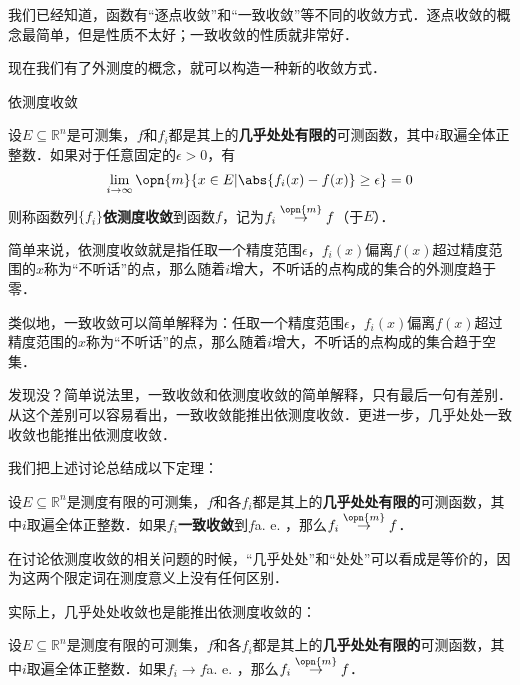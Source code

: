 

我们已经知道，函数有“逐点收敛”和“一致收敛”等不同的收敛方式．逐点收敛的概念最简单，但是性质不太好；一致收敛的性质就非常好．

现在我们有了外测度的概念，就可以构造一种新的收敛方式．

\begin{definition}{依测度收敛}

设$E\subseteq \mathbb{R}^n$是可测集，$f$和$f_i$都是其上的\textbf{几乎处处有限的}可测函数，其中$i$取遍全体正整数．如果对于任意固定的$\epsilon>0$，有
\begin{equation}
\lim\limits_{i\to\infty}\opn{m}\{x\in E|\abs{f_i(x)-f(x)}\geq\epsilon\}=0
\end{equation}
则称函数列$\{f_i\}$\textbf{依测度收敛}到函数$f$，记为$f_i\overset{\opn{m}}\to f$（于$E$）．

\end{definition}

简单来说，依测度收敛就是指任取一个精度范围$\epsilon$，$f_i(x)$偏离$f(x)$超过精度范围的$x$称为“不听话”的点，那么随着$i$增大，不听话的点构成的集合的外测度趋于零．

类似地，一致收敛可以简单解释为：任取一个精度范围$\epsilon$，$f_i(x)$偏离$f(x)$超过精度范围的$x$称为“不听话”的点，那么随着$i$增大，不听话的点构成的集合趋于空集．

发现没？简单说法里，一致收敛和依测度收敛的简单解释，只有最后一句有差别．从这个差别可以容易看出，一致收敛能推出依测度收敛．更进一步，几乎处处一致收敛也能推出依测度收敛．

我们把上述讨论总结成以下定理：



\begin{theorem}{}\label{LimMs_the2}

设$E\subseteq \mathbb{R}^n$是测度有限的可测集，$f$和各$f_i$都是其上的\textbf{几乎处处有限的}可测函数，其中$i$取遍全体正整数．如果$f_i$\textbf{一致收敛}到$f$a. e.  ，那么$f_i\overset{\opn{m}}\to f$．

\end{theorem}



在讨论依测度收敛的相关问题的时候，“几乎处处”和“处处”可以看成是等价的，因为这两个限定词在测度意义上没有任何区别．

实际上，几乎处处收敛也是能推出依测度收敛的：

\begin{theorem}{}\label{LimMs_the1}

设$E\subseteq \mathbb{R}^n$是测度有限的可测集，$f$和各$f_i$都是其上的\textbf{几乎处处有限的}可测函数，其中$i$取遍全体正整数．如果$f_i\to f $a. e. ，那么$f_i\overset{\opn{m}}\to f$．



\end{theorem}

